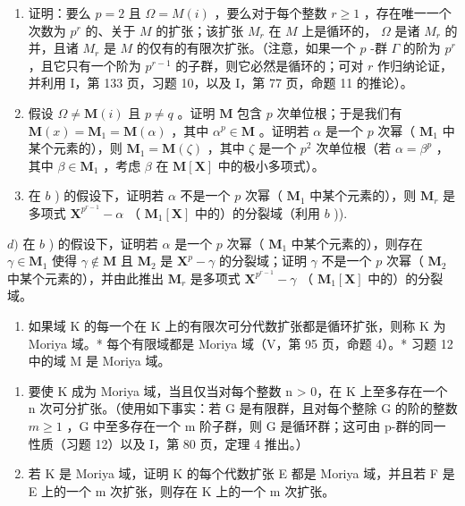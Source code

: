 \begin{enumerate}
\def\labelenumi{\alph{enumi})}
\item
  证明：要么 \(p = 2\) 且 \(\Omega = M(i)\) ，要么对于每个整数 \(r \geqslant 1\) ，存在唯一一个次数为 \(p^r\) 的、关于 \(M\) 的扩张；该扩张 \(M_r\) 在 \(M\) 上是循环的， \(\Omega\) 是诸 \(M_r\) 的并，且诸 \(M_r\) 是 \(M\) 的仅有的有限次扩张。（注意，如果一个 \(p\) -群 \(\Gamma\) 的阶为 \(p^r\) ，且它只有一个阶为 \(p^{r-1}\) 的子群，则它必然是循环的；可对 \(r\) 作归纳论证，并利用 I，第 133 页，习题 10，以及 I，第 77 页，命题 11 的推论）。
\item
  假设 \(\Omega \neq \mathbf{M}(i)\) 且 \(p \neq q\) 。证明 \(\mathbf{M}\) 包含 \(p\) 次单位根；于是我们有 \(\mathbf{M}(x) = \mathbf{M}_1 = \mathbf{M}(\alpha)\) ，其中 \(\alpha^p \in \mathbf{M}\) 。证明若 \(\alpha\) 是一个 \(p\) 次幂（ \(\mathbf{M}_1\) 中某个元素的），则 \(\mathbf{M}_1 = \mathbf{M}(\zeta)\) ，其中 \(\zeta\) 是一个 \(p^2\) 次单位根（若 \(\alpha = \beta^p\) ，其中 \(\beta \in \mathbf{M}_1\) ，考虑 \(\beta\) 在 \(\mathbf{M}[\mathbf{X}]\) 中的极小多项式）。
\item
  在 \(b\) ) 的假设下，证明若 \(\alpha\) 不是一个 \(p\) 次幂（ \(\mathbf{M}_1\) 中某个元素的），则 \(\mathbf{M}_r\) 是多项式 \(\mathbf{X}^{p^{r-1}} - \alpha\) （ \(\mathbf{M}_1[\mathbf{X}]\) 中的）的分裂域（利用 \(b\) )).
\end{enumerate}

\(d)\) 在 \(b\) ) 的假设下，证明若 \(\alpha\) 是一个 \(p\) 次幂（ \(\mathbf{M}_1\) 中某个元素的），则存在 \(\gamma \in \mathbf{M}_1\) 使得 \(\gamma \notin \mathbf{M}\) 且 \(\mathbf{M}_2\) 是 \(\mathbf{X}^p - \gamma\) 的分裂域；证明 \(\gamma\) 不是一个 \(p\) 次幂（ \(\mathbf{M}_2\) 中某个元素的），并由此推出 \(\mathbf{M}_r\) 是多项式 \(\mathbf{X}^{p^{r-1}} - \gamma\) （ \(\mathbf{M}_1[\mathbf{X}]\) 中的）的分裂域。

\begin{enumerate}
\def\labelenumi{\arabic{enumi})}
\setcounter{enumi}{12}
\tightlist
\item
  如果域 K 的每一个在 K 上的有限次可分代数扩张都是循环扩张，则称 K 为 Moriya 域。* 每个有限域都是 Moriya 域（V，第 95 页，命题 4）。* 习题 12 中的域 M 是 Moriya 域。
\end{enumerate}

\begin{enumerate}
\def\labelenumi{\alph{enumi})}
\item
  要使 K 成为 Moriya 域，当且仅当对每个整数 n \textgreater{} 0，在 K 上至多存在一个 n 次可分扩张。（使用如下事实：若 G 是有限群，且对每个整除 G 的阶的整数 \(m \geqslant 1\) ，G 中至多存在一个 m 阶子群，则 G 是循环群；这可由 p-群的同一性质（习题 12）以及 I，第 80 页，定理 4 推出。）
\item
  若 K 是 Moriya 域，证明 K 的每个代数扩张 E 都是 Moriya 域，并且若 F 是 E 上的一个 m 次扩张，则存在 K 上的一个 m 次扩张。
\end{enumerate}

